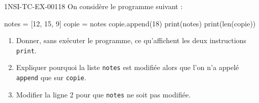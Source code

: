 \begin{exercice}{1NSI-TC-EX-001}{1}{8}
On considère le programme suivant :
\begin{python}
notes = [12, 15, 9]
copie = notes
copie.append(18)
print(notes)
print(len(copie))
\end{python}
\begin{enumerate}
  \item Donner, sans exécuter le programme, ce qu'affichent les deux instructions \texttt{print}.
  \item Expliquer pourquoi la liste \texttt{notes} est modifiée alors que l'on n'a
        appelé \texttt{append} que sur \texttt{copie}.
  \item Modifier la ligne 2 pour que \texttt{notes} ne soit pas modifiée.
\end{enumerate}
\end{exercice}
